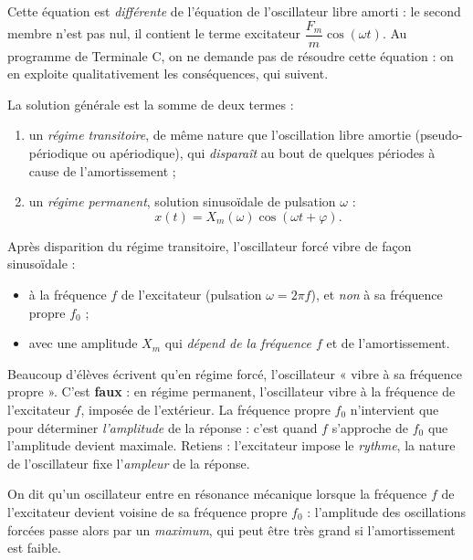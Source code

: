 \documentclass[11pt]{article}
\newcommand{\cle}[1]{{\popxbold\color{popdark}#1}}
\newcounter{popsec}
\newcounter{popsub}
\newcommand{\courssub}[1]{%
  \stepcounter{popsub}%
  \par\vspace{9pt}\noindent{\popxbold\fontsize{11.5}{13}\selectfont\color{popink}{\color{poporange}\thepopsec.\thepopsub}\hspace{6pt}#1}\par\nopagebreak\vspace{4pt}
}
\begin{document}
\begin{attention}
Cette équation est \emph{différente} de l'équation de l'oscillateur libre amorti : le second membre n'est pas nul, il contient le terme excitateur $\dfrac{F_m}{m}\cos(\omega t)$. Au programme de Terminale C, on ne demande pas de résoudre cette équation : on en exploite qualitativement les conséquences, qui suivent.
\end{attention}

La solution générale est la somme de deux termes :
\begin{enumerate}
\item un \emph{régime transitoire}, de même nature que l'oscillation libre amortie (pseudo-périodique ou apériodique), qui \emph{disparaît} au bout de quelques périodes à cause de l'amortissement ;
\item un \emph{régime permanent}, solution sinusoïdale de pulsation $\omega$ :
\[ x(t) = X_m(\omega)\cos(\omega t + \varphi). \]
\end{enumerate}

\begin{propriete}
Après disparition du régime transitoire, l'oscillateur forcé vibre de façon sinusoïdale :
\begin{itemize}
\item à la \cle{fréquence $f$ de l'excitateur} (pulsation $\omega = 2\pi f$), et \emph{non} à sa fréquence propre $f_0$ ;
\item avec une amplitude $X_m$ qui \emph{dépend de la fréquence $f$} et de l'amortissement.
\end{itemize}
\end{propriete}

\begin{attention}
Beaucoup d'élèves écrivent qu'en régime forcé, l'oscillateur « vibre à sa fréquence propre ». C'est \textbf{faux} : en régime permanent, l'oscillateur vibre à la \cle{fréquence de l'excitateur} $f$, imposée de l'extérieur. La fréquence propre $f_0$ n'intervient que pour déterminer \emph{l'amplitude} de la réponse : c'est quand $f$ s'approche de $f_0$ que l'amplitude devient maximale. Retiens : l'excitateur impose le \emph{rythme}, la nature de l'oscillateur fixe l'\emph{ampleur} de la réponse.
\end{attention}

\courssub{La résonance mécanique}

\begin{definition}
On dit qu'un oscillateur entre en \cle{résonance mécanique} lorsque la fréquence $f$ de l'excitateur devient voisine de sa fréquence propre $f_0$ : l'amplitude des oscillations forcées passe alors par un \emph{maximum}, qui peut être très grand si l'amortissement est faible.
\end{definition}
\end{document}
